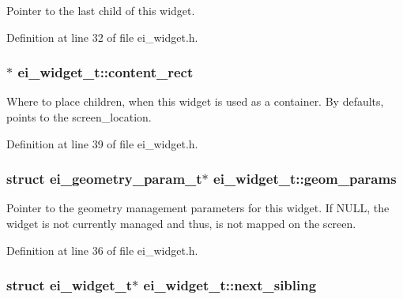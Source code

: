 Pointer to the last child of this widget. 



Definition at line 32 of file ei\+\_\+widget.\+h.

\hypertarget{structei__widget__t_a75c29d388a5f5b32cdd8a9c855bc2a75}{
\subsubsection[{content\+\_\+rect}]{$\ast$ ei\+\_\+widget\+\_\+t\+::content\+\_\+rect}}\label{structei__widget__t_a75c29d388a5f5b32cdd8a9c855bc2a75}


Where to place children, when this widget is used as a container. By defaults, points to the screen\+\_\+location. 



Definition at line 39 of file ei\+\_\+widget.\+h.

\hypertarget{structei__widget__t_a31885277c641803a931fff1d6256203f}{
\subsubsection[{geom\+\_\+params}]{\setlength{\rightskip}{0pt plus 5cm}struct {\bf ei\+\_\+geometry\+\_\+param\+\_\+t}$\ast$ ei\+\_\+widget\+\_\+t\+::geom\+\_\+params}}\label{structei__widget__t_a31885277c641803a931fff1d6256203f}


Pointer to the geometry management parameters for this widget. If N\+U\+L\+L, the widget is not currently managed and thus, is not mapped on the screen. 



Definition at line 36 of file ei\+\_\+widget.\+h.

\hypertarget{structei__widget__t_ada15cedaf8e6e104a1461c1754ff6cb3}{
\subsubsection[{next\+\_\+sibling}]{\setlength{\rightskip}{0pt plus 5cm}struct {\bf ei\+\_\+widget\+\_\+t}$\ast$ ei\+\_\+widget\+\_\+t\+::next\+\_\+sibling}}\label{structei__widget__t_ada15cedaf8e6e104a1461c1754ff6cb3}


